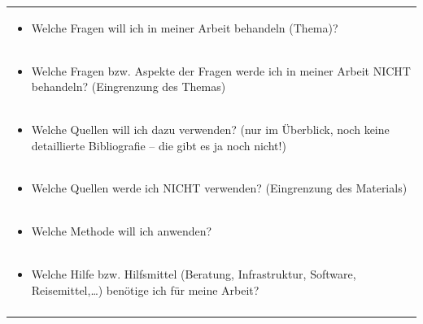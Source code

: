 \documentclass[]{book}
\providecommand{\tightlist}{%
  \setlength{\itemsep}{0pt}\setlength{\parskip}{0pt}}
\theoremstyle{definition}
\theoremstyle{definition}
\theoremstyle{definition}
\theoremstyle{remark}
\begin{document}
\begin{longtable}[]{@{}l@{}}
\begin{minipage}[t]{0.97\columnwidth}
\begin{itemize}
\tightlist
\item
  Welche Fragen will ich in meiner Arbeit behandeln (Thema)?
\end{itemize}\strut
\end{minipage}\tabularnewline
\begin{minipage}[t]{0.97\columnwidth}\raggedright\strut
\begin{itemize}
\tightlist
\item
  Welche Fragen bzw. Aspekte der Fragen werde ich in meiner Arbeit NICHT
  behandeln? (Eingrenzung des Themas)
\end{itemize}\strut
\end{minipage}\tabularnewline
\begin{minipage}[t]{0.97\columnwidth}\raggedright\strut
\begin{itemize}
\tightlist
\item
  Welche Quellen will ich dazu verwenden? (nur im Überblick, noch keine
  detaillierte Bibliografie -- die gibt es ja noch nicht!)
\end{itemize}\strut
\end{minipage}\tabularnewline
\begin{minipage}[t]{0.97\columnwidth}\raggedright\strut
\begin{itemize}
\tightlist
\item
  Welche Quellen werde ich NICHT verwenden? (Eingrenzung des Materials)
\end{itemize}\strut
\end{minipage}\tabularnewline
\begin{minipage}[t]{0.97\columnwidth}\raggedright\strut
\begin{itemize}
\tightlist
\item
  Welche Methode will ich anwenden?
\end{itemize}\strut
\end{minipage}\tabularnewline
\begin{minipage}[t]{0.97\columnwidth}\raggedright\strut
\begin{itemize}
\tightlist
\item
  Welche Hilfe bzw. Hilfsmittel (Beratung, Infrastruktur, Software,
  Reisemittel,\ldots{}) benötige ich für meine Arbeit?
\end{itemize}\strut
\end{minipage}\tabularnewline
\begin{minipage}[t]{0.97\columnwidth}\raggedright\strut
\begin{itemize}

\end{itemize}
\end{minipage}
\end{longtable}
\end{document}

